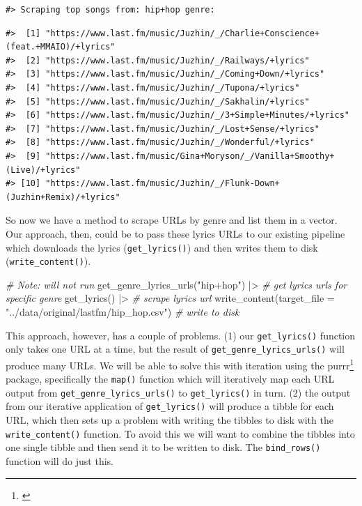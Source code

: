 \documentclass[
  letterpaper,
]{scrbook}
\newenvironment{Shaded}{\begin{snugshade}}{\end{snugshade}}
\newcommand{\AttributeTok}[1]{\textcolor[rgb]{0.00,0.00,0.00}{#1}}
\newcommand{\CommentTok}[1]{\textcolor[rgb]{0.00,0.00,0.00}{\textit{#1}}}
\newcommand{\FunctionTok}[1]{\textcolor[rgb]{0.00,0.00,0.00}{#1}}
\newcommand{\NormalTok}[1]{\textcolor[rgb]{0.00,0.00,0.00}{#1}}
\newcommand{\SpecialCharTok}[1]{\textcolor[rgb]{0.00,0.00,0.00}{#1}}
\newcommand{\StringTok}[1]{\textcolor[rgb]{0.00,0.00,0.00}{#1}}
\DeclareRobustCommand{\href}[2]{#2\footnote{\url{#1}}}
\begin{document}
\begin{verbatim}
#> Scraping top songs from: hip+hop genre:
\end{verbatim}

\begin{verbatim}
#>  [1] "https://www.last.fm/music/Juzhin/_/Charlie+Conscience+(feat.+MMAIO)/+lyrics"
#>  [2] "https://www.last.fm/music/Juzhin/_/Railways/+lyrics"                        
#>  [3] "https://www.last.fm/music/Juzhin/_/Coming+Down/+lyrics"                     
#>  [4] "https://www.last.fm/music/Juzhin/_/Tupona/+lyrics"                          
#>  [5] "https://www.last.fm/music/Juzhin/_/Sakhalin/+lyrics"                        
#>  [6] "https://www.last.fm/music/Juzhin/_/3+Simple+Minutes/+lyrics"                
#>  [7] "https://www.last.fm/music/Juzhin/_/Lost+Sense/+lyrics"                      
#>  [8] "https://www.last.fm/music/Juzhin/_/Wonderful/+lyrics"                       
#>  [9] "https://www.last.fm/music/Gina+Moryson/_/Vanilla+Smoothy+(Live)/+lyrics"    
#> [10] "https://www.last.fm/music/Juzhin/_/Flunk-Down+(Juzhin+Remix)/+lyrics"
\end{verbatim}

So now we have a method to scrape URLs by genre and list them in a
vector. Our approach, then, could be to pass these lyrics URLs to our
existing pipeline which downloads the lyrics (\texttt{get\_lyrics()})
and then writes them to disk (\texttt{write\_content()}).

\begin{Shaded}
\begin{Highlighting}[]
\CommentTok{\# Note: will not run}
\FunctionTok{get\_genre\_lyrics\_urls}\NormalTok{(}\StringTok{"hip+hop"}\NormalTok{) }\SpecialCharTok{|\textgreater{}} \CommentTok{\# get lyrics urls for specific genre}
  \FunctionTok{get\_lyrics}\NormalTok{() }\SpecialCharTok{|\textgreater{}} \CommentTok{\# scrape lyrics url}
  \FunctionTok{write\_content}\NormalTok{(}\AttributeTok{target\_file =} \StringTok{"../data/original/lastfm/hip\_hop.csv"}\NormalTok{) }\CommentTok{\# write to disk}
\end{Highlighting}
\end{Shaded}

This approach, however, has a couple of problems. (1) our
\texttt{get\_lyrics()} function only takes one URL at a time, but the
result of \texttt{get\_genre\_lyrics\_urls()} will produce many URLs. We
will be able to solve this with iteration using the \href{}{purrr}
package, specifically the \texttt{map()} function which will iteratively
map each URL output from \texttt{get\_genre\_lyrics\_urls()} to
\texttt{get\_lyrics()} in turn. (2) the output from our iterative
application of \texttt{get\_lyrics()} will produce a tibble for each
URL, which then sets up a problem with writing the tibbles to disk with
the \texttt{write\_content()} function. To avoid this we will want to
combine the tibbles into one single tibble and then send it to be
written to disk. The \texttt{bind\_rows()} function will do just this.
\end{document}

